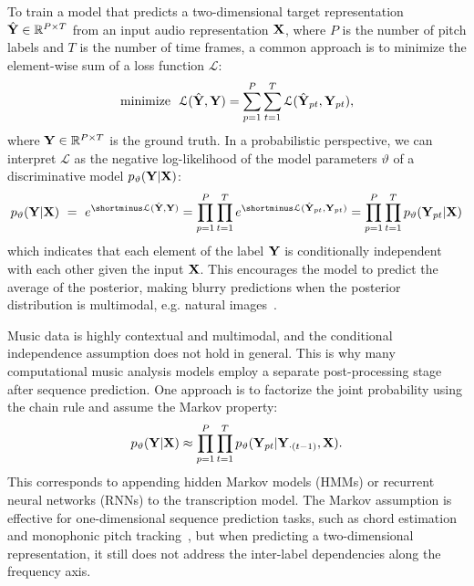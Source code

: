 To train a model that predicts a two-dimensional target representation $\hat{\mathbf{Y}} \in \mathbb{R}^{P \times T}$ from an input audio representation $\mathbf{X}$, where $P$ is the number of pitch labels and $T$ is the number of time frames, a common approach is to minimize the element-wise sum of a loss function $\mathcal{L}$:
\begin{equation}\label{eqn:elementwise}
\textrm{minimize} ~~ \mathcal{L}(\hat{\mathbf{Y}}, \mathbf{Y}) = \sum_{p=1}^{P}  \sum_{t=1}^{T} \mathcal{L} (\hat{\mathbf{Y}}_{pt}, \mathbf{Y}_{pt}),
\end{equation}
where $\mathbf{Y} \in \mathbb{R}^{P \times T}$ is the ground truth.
In a probabilistic perspective, we can interpret $\mathcal{L}$ as the negative log-likelihood of the model parameters $\vartheta$ of a discriminative model $p_\vartheta(\mathbf{Y} | \mathbf{X})$:
\begin{equation}
p_\vartheta(\Y | \X) ~=~ e^{\shortminus\mathcal{L}(\hat{\Y}, \Y)} = \prod_{p=1}^{P} \prod_{t=1}^{T} e^{\shortminus\mathcal{L}(\hat{\Y}_{pt}, \Y_{pt})} = \prod_{p=1}^{P} \prod_{t=1}^{T} p_\vartheta(\Y_{pt} | \X)
\end{equation}
which indicates that each element of the label $\mathbf{Y}$ is conditionally independent with each other given the input $\mathbf{X}$.
This encourages the model to predict the average of the posterior, making blurry predictions when the posterior distribution is multimodal, e.g. natural images~\cite{dosovitskiy2016generating}.

Music data is highly contextual and multimodal, and the conditional independence assumption does not hold in general.
This is why many computational music analysis models employ a separate post-processing stage after sequence prediction.
One approach is to factorize the joint probability using the chain rule and assume the Markov property:
\begin{equation}
p_\vartheta(\mathbf{Y}|\mathbf{X}) \approx \prod_{p=1}^{P} \prod_{t=1}^{T} p_\vartheta(\mathbf{Y}_{pt} | \mathbf{Y}_{\cdot(t-1)}, \mathbf{X}).
\end{equation}
This corresponds to appending hidden Markov models (HMMs) \cite{poliner2006discriminative} or recurrent neural networks (RNNs) \cite{sigtia2016endtoend,hawthorne2018onsetsframes} to the transcription model.
The Markov assumption is effective for one-dimensional sequence prediction tasks, such as chord estimation~\cite{ni2012harmonic} and monophonic pitch tracking~\cite{mauch2014pyin}, but when predicting a two-dimensional representation, it still does not address the inter-label dependencies along the frequency axis.


